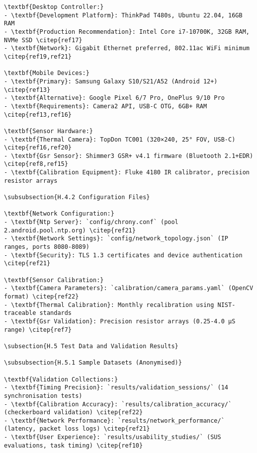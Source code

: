 \begin{verbatim}
\textbf{Desktop Controller:}
- \textbf{Development Platform}: ThinkPad T480s, Ubuntu 22.04, 16GB RAM
- \textbf{Production Recommendation}: Intel Core i7-10700K, 32GB RAM, NVMe SSD \citep{ref17}
- \textbf{Network}: Gigabit Ethernet preferred, 802.11ac WiFi minimum \citep{ref19,ref21}

\textbf{Mobile Devices:}
- \textbf{Primary}: Samsung Galaxy S10/S21/A52 (Android 12+) \citep{ref13}
- \textbf{Alternative}: Google Pixel 6/7 Pro, OnePlus 9/10 Pro
- \textbf{Requirements}: Camera2 API, USB-C OTG, 6GB+ RAM \citep{ref13,ref16}

\textbf{Sensor Hardware:}
- \textbf{Thermal Camera}: TopDon TC001 (320×240, 25° FOV, USB-C) \citep{ref16,ref20}
- \textbf{Gsr Sensor}: Shimmer3 GSR+ v4.1 firmware (Bluetooth 2.1+EDR) \citep{ref8,ref15}
- \textbf{Calibration Equipment}: Fluke 4180 IR calibrator, precision resistor arrays

\subsubsection{H.4.2 Configuration Files}

\textbf{Network Configuration:}
- \textbf{Ntp Server}: `config/chrony.conf` (pool 2.android.pool.ntp.org) \citep{ref21}
- \textbf{Network Settings}: `config/network_topology.json` (IP ranges, ports 8080-8089)
- \textbf{Security}: TLS 1.3 certificates and device authentication \citep{ref21}

\textbf{Sensor Calibration:}
- \textbf{Camera Parameters}: `calibration/camera_params.yaml` (OpenCV format) \citep{ref22}
- \textbf{Thermal Calibration}: Monthly recalibration using NIST-traceable standards
- \textbf{Gsr Validation}: Precision resistor arrays (0.25-4.0 μS range) \citep{ref7}

\subsection{H.5 Test Data and Validation Results}

\subsubsection{H.5.1 Sample Datasets (Anonymised)}

\textbf{Validation Collections:}
- \textbf{Timing Precision}: `results/validation_sessions/` (14 synchronisation tests)
- \textbf{Calibration Accuracy}: `results/calibration_accuracy/` (checkerboard validation) \citep{ref22}
- \textbf{Network Performance}: `results/network_performance/` (latency, packet loss logs) \citep{ref21}
- \textbf{User Experience}: `results/usability_studies/` (SUS evaluations, task timing) \citep{ref10}


\end{verbatim}
